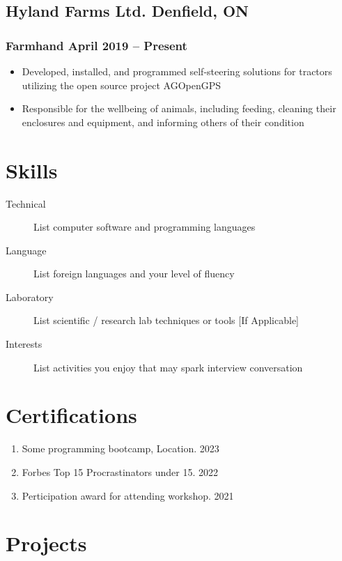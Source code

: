\documentclass[11pt]{article}
\newcommand{\rside}[1]{
  \hfill {\normalfont\color{accent} #1}%
}
\begin{document}
\subsection{Hyland Farms Ltd. \rside{Denfield, ON}}
\subsubsection{Farmhand \rside{April 2019 -- Present}}
\begin{itemize}
  \item Developed, installed, and programmed self-steering solutions for tractors utilizing the open source project AGOpenGPS
  \item Responsible for the wellbeing of animals, including feeding, cleaning their enclosures and equipment, and informing others of their condition
\end{itemize}


\section{Skills}
\begin{description}
  \item[Technical] List computer software and programming languages 
  \item[Language] List foreign languages and your level of fluency
  \item[Laboratory] List scientific / research lab techniques or tools [If Applicable]
  \item[Interests] List activities you enjoy that may spark interview conversation
\end{description}


\section{Certifications}
\begin{enumerate}[label=\null, left=0pt..0pt, itemsep=0pt]
  \item Some programming bootcamp, Location. \rside{2023}
  \item Forbes Top 15 Procrastinators under 15. \rside{2022}
  \item Perticipation award for attending workshop. \rside{2021}
\end{enumerate}


\section{Projects}
\end{document}
